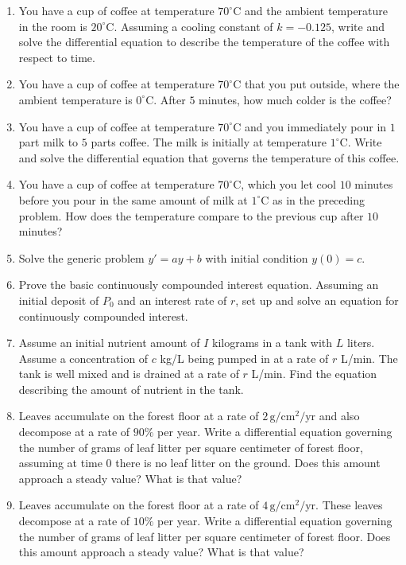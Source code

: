 \documentclass{exercises}
\begin{document}
\begin{enumerate}[resume]
\item You have a cup of coffee at temperature $70^\circ \text{C}$ and the ambient temperature in the room is $20^\circ \text{C}$. Assuming a cooling constant of $k=-0.125$, write and solve the differential equation to describe the temperature of the coffee with respect to time.
\item \techrequired You have a cup of coffee at temperature $70^\circ \text{C}$ that you put outside, where the ambient temperature is $0^\circ \text{C}$. After $5$ minutes, how much colder is the coffee?
\item You have a cup of coffee at temperature $70^\circ \text{C}$ and you immediately pour in $1$ part milk to $5$ parts coffee. The milk is initially at temperature $1^\circ \text{C}$. Write and solve the differential equation that governs the temperature of this coffee.
\item You have a cup of coffee at temperature $70^\circ \text{C}$, which you let cool $10$ minutes before you pour in the same amount of milk at $1^\circ \text{C}$ as in the preceding problem. How does the temperature compare to the previous cup after $10$ minutes?
\item Solve the generic problem $y'=ay+b$ with initial condition $y(0)=c$.
\item Prove the basic continuously compounded interest equation. Assuming an initial deposit of $P_{0}$ and an interest rate of $r$, set up and solve an equation for continuously compounded interest.
\item Assume an initial nutrient amount of $I$ kilograms in a tank with $L$ liters. Assume a concentration of $c$ kg/L being pumped in at a rate of $r$ L/min. The tank is well mixed and is drained at a rate of $r$ L/min. Find the equation describing the amount of nutrient in the tank.
\item Leaves accumulate on the forest floor at a rate of $2\,\text{g}/\text{cm}^{2}/\text{yr}$ and also decompose at a rate of $90\%$ per year. Write a differential equation governing the number of grams of leaf litter per square centimeter of forest floor, assuming at time $0$ there is no leaf litter on the ground. Does this amount approach a steady value? What is that value?
\item Leaves accumulate on the forest floor at a rate of $4\,\text{g}/\text{cm}^{2}/\text{yr}$. These leaves decompose at a rate of $10\%$ per year. Write a differential equation governing the number of grams of leaf litter per square centimeter of forest floor. Does this amount approach a steady value? What is that value?
\end{enumerate}
\end{document}
